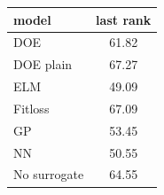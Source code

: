 \begin{tabular}{|lc|}
\hline
model & last rank\\
\hline
DOE & 61.82 \\
DOE plain & 67.27 \\
ELM & 49.09 \\
Fitloss & 67.09 \\
GP & 53.45 \\
NN & 50.55 \\
No surrogate & 64.55 \\
\hline
\end{tabular}
